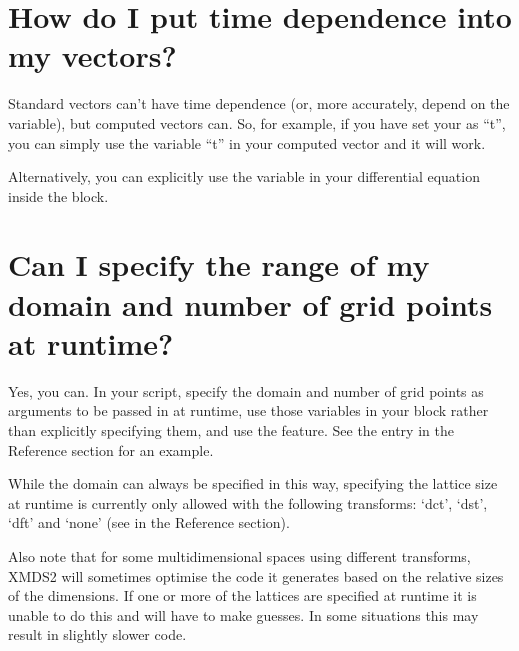 \documentclass[letterpaper,10pt,english]{sphinxmanual}
\begin{document}
\section{How do I put time dependence into my vectors?}
\label{\detokenize{faq:how-do-i-put-time-dependence-into-my-vectors}}\label{\detokenize{faq:index-3}}
\sphinxAtStartPar
Standard vectors can’t have time dependence (or, more accurately, depend on the  variable), but computed vectors can. So, for example, if you have set your  as “t”, you can simply use the variable “t” in your computed vector and it will work.

\sphinxAtStartPar
Alternatively, you can explicitly use the  variable in your differential equation inside the  block.

\ignorespaces 

\section{Can I specify the range of my domain and number of grid points at run\sphinxhyphen{}time?}
\label{\detokenize{faq:can-i-specify-the-range-of-my-domain-and-number-of-grid-points-at-run-time}}\label{\detokenize{faq:index-4}}
\sphinxAtStartPar
Yes, you can. In your script, specify the domain and number of grid points as arguments to be passed in at run\sphinxhyphen{}time, use those variables in your  block rather than explicitly specifying them, and use the  feature. See the {\hyperref[\detokenize{reference_elements:validation}]{}} entry in the Reference section for an example.

\sphinxAtStartPar
While the domain can always be specified in this way, specifying the lattice size at run\sphinxhyphen{}time is currently only allowed with the following transforms: ‘dct’, ‘dst’, ‘dft’ and ‘none’ (see {\hyperref[\detokenize{reference_elements:validation}]{}} in the Reference section).

\sphinxAtStartPar
Also note that for some multi\sphinxhyphen{}dimensional spaces using different transforms, XMDS2 will sometimes optimise the code it generates based on the relative sizes of the dimensions. If one or more of the lattices are specified at run\sphinxhyphen{}time it is unable to do this and will have to make guesses. In some situations this may result in slightly slower code.
\end{document}
